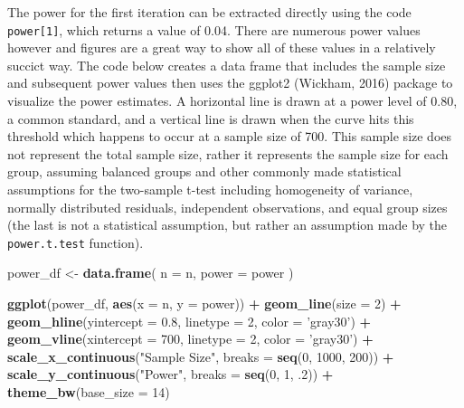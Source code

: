 \documentclass[man,mask,floatsintext]{apa6}
\newenvironment{Shaded}{\begin{snugshade}}{\end{snugshade}}
\newcommand{\DataTypeTok}[1]{\textcolor[rgb]{0.13,0.29,0.53}{#1}}
\newcommand{\DecValTok}[1]{\textcolor[rgb]{0.00,0.00,0.81}{#1}}
\newcommand{\FloatTok}[1]{\textcolor[rgb]{0.00,0.00,0.81}{#1}}
\newcommand{\KeywordTok}[1]{\textcolor[rgb]{0.13,0.29,0.53}{\textbf{#1}}}
\newcommand{\NormalTok}[1]{#1}
\newcommand{\OperatorTok}[1]{\textcolor[rgb]{0.81,0.36,0.00}{\textbf{#1}}}
\newcommand{\StringTok}[1]{\textcolor[rgb]{0.31,0.60,0.02}{#1}}
\begin{document}
The power for the first iteration can be extracted directly using the code \texttt{power{[}1{]}}, which returns a value of 0.04. There are numerous power values however and figures are a great way to show all of these values in a relatively succict way. The code below creates a data frame that includes the sample size and subsequent power values then uses the ggplot2 (Wickham, 2016) package to visualize the power estimates. A horizontal line is drawn at a power level of 0.80, a common standard, and a vertical line is drawn when the curve hits this threshold which happens to occur at a sample size of 700. This sample size does not represent the total sample size, rather it represents the sample size for each group, assuming balanced groups and other commonly made statistical assumptions for the two-sample t-test including homogeneity of variance, normally distributed residuals, independent observations, and equal group sizes (the last is not a statistical assumption, but rather an assumption made by the \texttt{power.t.test} function).

\begin{Shaded}
\begin{Highlighting}[]
\NormalTok{power_df <-}\StringTok{ }\KeywordTok{data.frame}\NormalTok{(}
  \DataTypeTok{n =}\NormalTok{ n,}
  \DataTypeTok{power =}\NormalTok{ power}
\NormalTok{)}

\KeywordTok{ggplot}\NormalTok{(power_df, }\KeywordTok{aes}\NormalTok{(}\DataTypeTok{x =}\NormalTok{ n, }\DataTypeTok{y =}\NormalTok{ power)) }\OperatorTok{+}\StringTok{ }
\StringTok{  }\KeywordTok{geom_line}\NormalTok{(}\DataTypeTok{size =} \DecValTok{2}\NormalTok{) }\OperatorTok{+}\StringTok{ }
\StringTok{  }\KeywordTok{geom_hline}\NormalTok{(}\DataTypeTok{yintercept =} \FloatTok{0.8}\NormalTok{, }\DataTypeTok{linetype =} \DecValTok{2}\NormalTok{, }\DataTypeTok{color =} \StringTok{'gray30'}\NormalTok{) }\OperatorTok{+}\StringTok{ }
\StringTok{  }\KeywordTok{geom_vline}\NormalTok{(}\DataTypeTok{xintercept =} \DecValTok{700}\NormalTok{, }\DataTypeTok{linetype =} \DecValTok{2}\NormalTok{, }\DataTypeTok{color =} \StringTok{'gray30'}\NormalTok{) }\OperatorTok{+}
\StringTok{  }\KeywordTok{scale_x_continuous}\NormalTok{(}\StringTok{"Sample Size"}\NormalTok{, }\DataTypeTok{breaks =} \KeywordTok{seq}\NormalTok{(}\DecValTok{0}\NormalTok{, }\DecValTok{1000}\NormalTok{, }\DecValTok{200}\NormalTok{)) }\OperatorTok{+}\StringTok{ }
\StringTok{  }\KeywordTok{scale_y_continuous}\NormalTok{(}\StringTok{"Power"}\NormalTok{, }\DataTypeTok{breaks =} \KeywordTok{seq}\NormalTok{(}\DecValTok{0}\NormalTok{, }\DecValTok{1}\NormalTok{, }\FloatTok{.2}\NormalTok{)) }\OperatorTok{+}
\StringTok{  }\KeywordTok{theme_bw}\NormalTok{(}\DataTypeTok{base_size =} \DecValTok{14}\NormalTok{)}
\end{Highlighting}
\end{Shaded}
\end{document}
